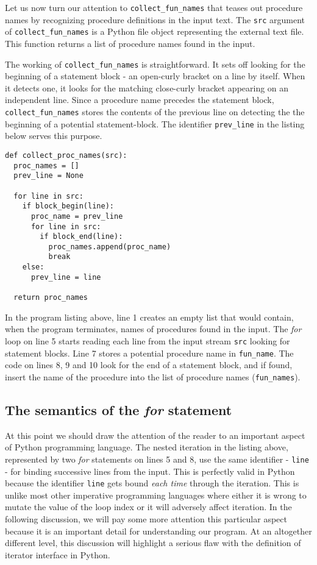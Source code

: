 \documentclass[10pt, a4paper]{article}
\begin{document}
Let us now turn our attention to \texttt{collect\_fun\_names} that teases out procedure names by recognizing procedure definitions in the input text. The \texttt{src} argument of \texttt{collect\_fun\_names} is a Python file object representing the external text file. This function returns a list of procedure names found in the input. 

The working of \texttt{collect\_fun\_names} is straightforward. It sets off looking for the beginning of a statement block - an open-curly bracket on a line by itself. When it detects one, it looks for the matching close-curly bracket appearing on an independent line. Since a procedure name precedes the statement block, \texttt{collect\_fun\_names} stores the contents of the previous line on detecting the the beginning of a potential statement-block. The identifier \texttt{prev\_line} in the listing below serves this purpose. 

\noindent\begin{lstlisting}
def collect_proc_names(src):
  proc_names = []
  prev_line = None

  for line in src:
    if block_begin(line):
      proc_name = prev_line
      for line in src:
        if block_end(line):
          proc_names.append(proc_name)
          break
    else:
      prev_line = line

  return proc_names
\end{lstlisting}

In the program listing above, line 1 creates an empty list that would contain, when the program terminates, names of procedures found in the input. The \textit{for} loop on line 5 starts reading each line from the input stream \texttt{src} looking for statement blocks. Line 7 stores a potential procedure name in \texttt{fun\_name}. The code on lines 8, 9 and 10 look for the end of a statement block, and if found, insert the name of the procedure into the list of procedure names (\texttt{fun\_names}).

\subsection{The semantics of the \textit{for} statement}
At this point we should draw the attention of the reader to an important aspect of Python programming language. The nested iteration in the listing above, represented by two \textit{for} statements on lines 5 and 8, use the same identifier - \texttt{line} - for binding successive lines from the input. This is perfectly valid in Python because the identifier \texttt{line} gets bound \textit{each time} through the iteration. This is unlike most other imperative programming languages where either it is wrong to mutate the value of the loop index or it will adversely affect iteration. In the following discussion, we will pay some more attention this particular aspect because it is an important detail for understanding our program. At an altogether different level, this discussion will highlight a serious flaw with the definition of iterator interface in Python.
\end{document}
